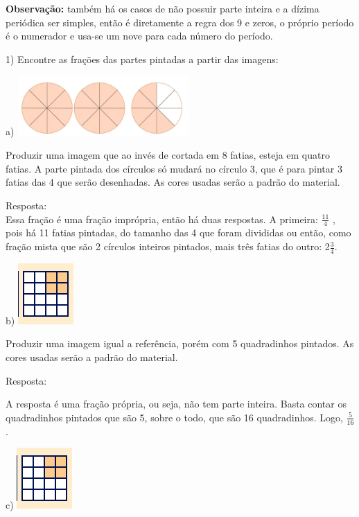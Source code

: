 \textbf{Observação:} também há os casos de não possuir parte inteira e a
dízima periódica ser simples, então é diretamente a regra dos 9 e zeros,
o próprio período é o numerador e usa-se um nove para cada número do
período.


1) Encontre as frações das partes pintadas a partir das imagens:

a)
\includegraphics[width=2.59149in,height=0.89856in]{./imgSAEB_7_MAT/media/image7.png}

Produzir uma imagem que ao invés de cortada em 8 fatias, esteja em
quatro fatias. A parte pintada dos círculos só mudará no círculo 3, que
é para pintar 3 fatias das 4 que serão desenhadas. As cores usadas serão
a padrão do material.

Resposta:\\
Essa fração é uma fração imprópria, então há duas respostas. A primeira:
\(\frac{11}{4}\) , pois há 11 fatias pintadas, do tamanho das 4 que
foram divididas ou então, como fração mista que são 2 círculos inteiros
pintados, mais três fatias do outro: 2\(\frac{3}{4}\).

b)
\includegraphics[width=0.83333in,height=0.91667in]{./imgSAEB_7_MAT/media/image8.png}

Produzir uma imagem igual a referência, porém com 5 quadradinhos
pintados. As cores usadas serão a padrão do material.

Resposta:

A resposta é uma fração própria, ou seja, não tem parte inteira. Basta
contar os quadradinhos pintados que são 5, sobre o todo, que são 16
quadradinhos. Logo, \(\frac{5}{16}\).

c)
\includegraphics[width=0.83333in,height=0.91667in]{./imgSAEB_7_MAT/media/image8.png}

